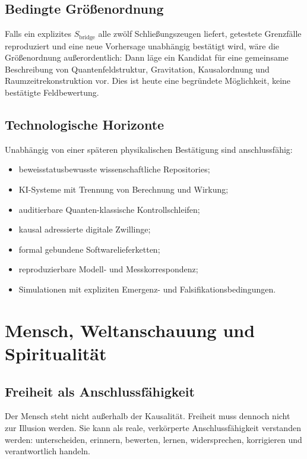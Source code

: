 \documentclass[11pt,a4paper]{article}
\begin{document}
\subsection{Bedingte Größenordnung}

Falls ein explizites \(S_{\mathrm{bridge}}\) alle zwölf Schließungszeugen
liefert, getestete Grenzfälle reproduziert und eine neue Vorhersage unabhängig
bestätigt wird, wäre die Größenordnung außerordentlich: Dann läge ein Kandidat
für eine gemeinsame Beschreibung von Quantenfeldstruktur, Gravitation,
Kausalordnung und Raumzeitrekonstruktion vor. Dies ist heute eine begründete
Möglichkeit, keine bestätigte Feldbewertung.

\subsection{Technologische Horizonte}

Unabhängig von einer späteren physikalischen Bestätigung sind anschlussfähig:

\begin{itemize}
  \item beweisstatusbewusste wissenschaftliche Repositories;
  \item KI-Systeme mit Trennung von Berechnung und Wirkung;
  \item auditierbare Quanten-klassische Kontrollschleifen;
  \item kausal adressierte digitale Zwillinge;
  \item formal gebundene Softwarelieferketten;
  \item reproduzierbare Modell- und Messkorrespondenz;
  \item Simulationen mit expliziten Emergenz- und Falsifikationsbedingungen.
\end{itemize}

\section{Mensch, Weltanschauung und Spiritualität}

\subsection{Freiheit als Anschlussfähigkeit}

Der Mensch steht nicht außerhalb der Kausalität. Freiheit muss dennoch nicht
zur Illusion werden. Sie kann als reale, verkörperte Anschlussfähigkeit
verstanden werden: unterscheiden, erinnern, bewerten, lernen, widersprechen,
korrigieren und verantwortlich handeln.
\end{document}
